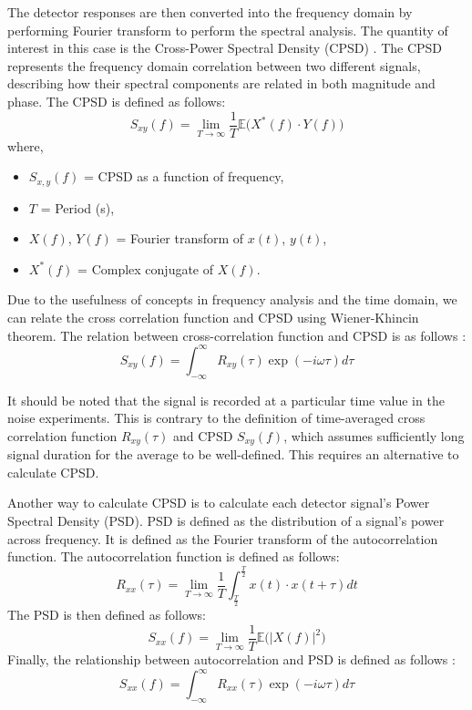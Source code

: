 The detector responses are then converted into the frequency domain by performing Fourier transform to perform the spectral analysis. The quantity of interest in this case is the Cross-Power Spectral Density (CPSD) \cite{ambrozicNoiseAnalysisTechniques2020}. The CPSD represents the frequency domain correlation between two different signals, describing how their spectral components are related in both magnitude and phase. The CPSD is defined as follows:
\begin{equation}
    S_{xy}(f) = \lim_{T \rightarrow \infty} \frac{1}{T} \mathbb{E} \bigg( X^*(f) \cdot Y(f) \bigg)
    \label{eq:S_xy}
\end{equation}
where,
\begin{itemize}
    \item[] $S_{x,y}(f)$ = \gls*{CPSD} as a function of frequency, 
    \item[] $T$ = Period (s), 
    \item[] $X(f)$, $Y(f)$ = Fourier transform of $x(t)$, $y(t)$, 
    \item[] $X^*(f)$ = Complex conjugate of $X(f)$. 
\end{itemize}

Due to the usefulness of concepts in frequency analysis and the time domain, we can relate the cross correlation function and CPSD using Wiener-Khincin theorem. The relation between cross-correlation function and CPSD is as follows \cite{kerlinFrequencyResponseTesting1974, thiePowerReactorNoise1981}:
\begin{equation}
    S_{xy}(f) = \int^{\infty}_{-\infty} R_{xy}(\tau) \exp{(-i \omega \tau)} d\tau
    \label{eq:S_xy-R_xy}
\end{equation}

It should be noted that the signal is recorded at a particular time value in the noise experiments. This is contrary to the definition of time-averaged cross correlation function  $R_{xy} (\tau)$  and CPSD $S_{xy} (f)$, which assumes sufficiently long signal duration for the average to be well-defined. This requires an alternative to calculate CPSD.

Another way to calculate CPSD is to calculate each detector signal’s Power Spectral Density (PSD). PSD is defined as the distribution of a signal’s power across frequency. It is defined as the Fourier transform of the autocorrelation function. The autocorrelation function is defined as follows:
\begin{equation}
    R_{xx}(\tau) = \lim_{T \rightarrow \infty} \frac{1}{T} \int_{\frac{T}{2}}^{\frac{T}{2}} x(t) \cdot x(t+\tau) dt
    \label{eq:R_xx}
\end{equation}
The PSD is then defined as follows:
\begin{equation}
    S_{xx}(f) = \lim_{T \rightarrow \infty} \frac{1}{T} \mathbb{E} \bigg( \left| X(f) \right|^2 \bigg)
    \label{eq:S_xx}
\end{equation}
Finally, the relationship between autocorrelation and PSD is defined as follows \cite{thiePowerReactorNoise1981}:
\begin{equation}
    S_{xx}(f) = \int^{\infty}_{-\infty} R_{xx}(\tau) \exp{(-i \omega \tau)} d\tau
    \label{eq:S_xx-R_xx}
\end{equation}

